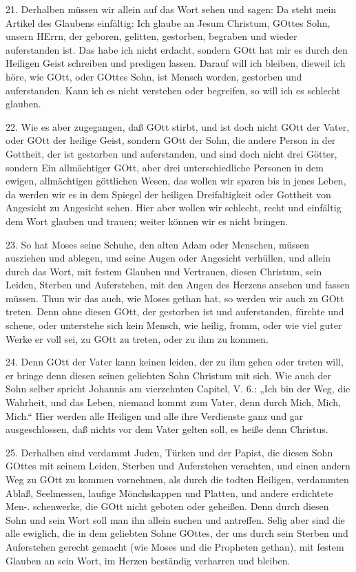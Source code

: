 21. Derhalben müssen wir allein auf das Wort sehen und sagen: Da steht mein Artikel des Glaubens einfältig: Ich glaube an Jesum Christum, GOttes Sohn, unsern HErrn, der geboren, gelitten, gestorben, begraben und wieder auferstanden ist. Das habe ich nicht erdacht, sondern GOtt hat mir es durch den Heiligen Geist schreiben und predigen lassen. Darauf will ich bleiben, dieweil ich höre, wie GOtt, oder GOttes Sohn, ist Mensch worden, gestorben und auferstanden. Kann ich es nicht verstehen oder begreifen, so will ich es schlecht glauben.

22. Wie es aber zugegangen, daß GOtt stirbt, und ist doch nicht GOtt der Vater, oder GOtt der heilige Geist, sondern GOtt der Sohn, die andere Person in der Gottheit, der ist gestorben und auferstanden, und sind doch nicht drei Götter, sondern Ein allmächtiger GOtt, aber drei unterschiedliche Personen in dem ewigen, allmächtigen göttlichen Wesen, das wollen wir sparen bis in jenes Leben, da werden wir es in dem Spiegel der heiligen Dreifaltigkeit oder Gottheit von Angesicht zu Angesicht sehen. Hier aber wollen wir schlecht, recht und einfältig dem Wort glauben und trauen; weiter können wir es nicht bringen.

23. So hat Moses seine Schuhe, den alten Adam oder Menschen, müssen ausziehen und ablegen, und seine Augen oder Angesicht verhüllen, und allein durch das Wort, mit festem Glauben und Vertrauen, diesen Christum, sein Leiden, Sterben und Auferstehen, mit den Augen des Herzens ansehen und fassen müssen. Thun wir das auch, wie Moses gethan hat, so werden wir auch zu GOtt treten. Denn ohne diesen GOtt, der gestorben ist und auferstanden, fürchte und scheue, oder unterstehe sich kein Mensch, wie heilig, fromm, oder wie viel guter Werke er voll sei, zu GOtt zu treten, oder zu ihm zu kommen.

24. Denn GOtt der Vater kann keinen leiden, der zu ihm gehen oder treten will, er bringe denn diesen seinen geliebten Sohn Christum mit sich. Wie auch der Sohn selber spricht Johannis am vierzehnten Capitel, V. 6.: „Ich bin der Weg, die Wahrheit, und das Leben, niemand kommt zum Vater, denn durch Mich, Mich, Mich.“ Hier werden alle Heiligen und alle ihre Verdienste ganz und gar ausgeschlossen, daß nichts vor dem Vater gelten soll, es heiße denn Christus.

25. Derhalben sind verdammt Juden, Türken und der Papist, die diesen Sohn GOttes mit seinem Leiden, Sterben und Auferstehen verachten, und einen andern Weg zu GOtt zu kommen vornehmen, als durch die todten Heiligen, verdammten Ablaß, Seelmessen, laufige Mönchskappen und Platten, und andere erdichtete Men-.
schenwerke, die GOtt nicht geboten oder geheißen. Denn durch diesen Sohn und sein Wort soll man ihn allein suchen und antreffen. Selig aber sind die alle ewiglich, die in dem geliebten Sohne GOttes, der uns durch sein Sterben und Auferstehen gerecht gemacht (wie Moses und die Propheten gethan), mit festem Glauben an sein Wort, im Herzen beständig verharren und bleiben.

